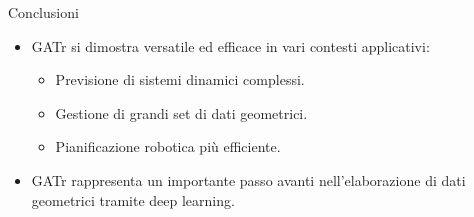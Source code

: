 \begin{frame}{Conclusioni}
    \begin{itemize}
        \item GATr si dimostra versatile ed efficace in vari contesti applicativi:
        \begin{itemize}
            \item Previsione di sistemi dinamici complessi.
            \item Gestione di grandi set di dati geometrici.
            \item Pianificazione robotica più efficiente.
        \end{itemize}
        \item GATr rappresenta un importante passo avanti nell'elaborazione di 
        dati geometrici tramite deep learning.
    \end{itemize}
\end{frame}

